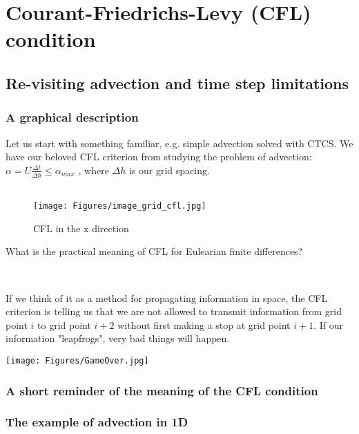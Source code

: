 \chapter{Courant-Friedrichs-Levy (CFL) condition}

\section{Re-visiting advection and time step limitations}
\subsection{A graphical description}

	Let us start with something familiar, e.g. simple advection solved with CTCS.
	We have our beloved CFL criterion from studying the problem of advection:
	$\alpha = U \frac{\Delta t}{\Delta h} \le \alpha_{max}$
	, where $\Delta h$ is our grid spacing.\\
	
	~

\begin{figure}
	\begin{center}
\texttt{[image: Figures/image\_grid\_cfl.jpg]}
	\end{center}
\caption{CFL in the x direction}
\end{figure}
	
What is the practical meaning of CFL for Eulearian finite differences?

~

If we think of it as a method for propagating information in space, the CFL criterion is telling us that we are not allowed to transmit information from grid point $i$ to grid point $i+2$ without first making a stop at grid point $i+1$.
If our information "leapfrogs", very bad things will happen.

	\begin{center}
\texttt{[image: Figures/GameOver.jpg]}
	\end{center}
	

\subsection{A short reminder of the meaning of the CFL condition}
\subsection{The example of advection in 1D}

